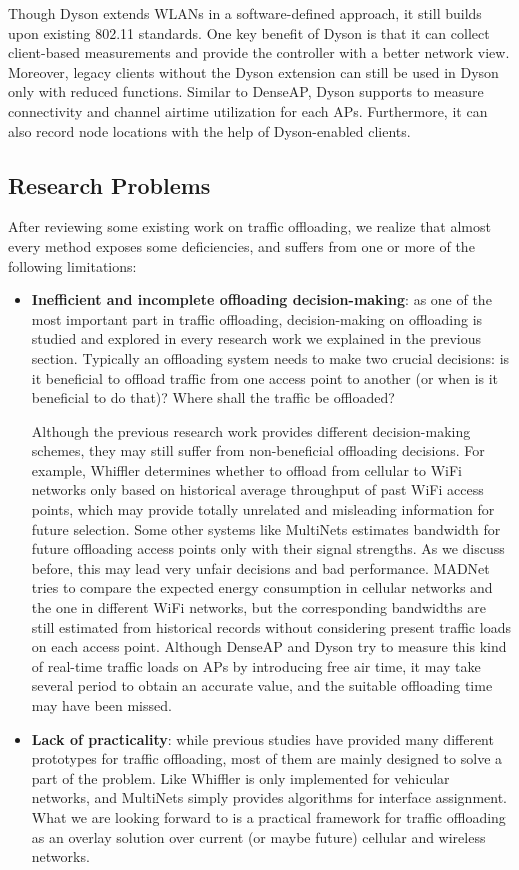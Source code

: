 \documentclass[english]{tktltiki}
\begin{document}
Though Dyson extends WLANs in a software-defined approach, it still builds upon existing 802.11 standards. One key benefit of Dyson is that it can collect client-based measurements and provide the controller with a better network view. Moreover, legacy clients without the Dyson extension can still be used in Dyson only with reduced functions. Similar to DenseAP, Dyson supports to measure connectivity and channel airtime utilization for each APs. Furthermore, it can also record node locations with the help of Dyson-enabled clients.


\subsection{Research Problems}

After reviewing some existing work on traffic offloading, we realize that almost every method exposes some deficiencies, and suffers from one or more of the following limitations:

\begin{itemize}
  \item \textbf{Inefficient and incomplete offloading decision-making}: as one of the most important part in traffic offloading, decision-making on offloading is studied and explored in every research work we explained in the previous section. Typically an offloading system needs to make two crucial decisions: is it beneficial to offload traffic from one access point to another (or when is it beneficial to do that)? Where shall the traffic be offloaded? 

Although the previous research work provides different decision-making schemes, they may still suffer from non-beneficial offloading decisions. For example, Whiffler determines whether to offload from cellular to WiFi networks only based on historical average throughput of past WiFi access points, which may provide totally unrelated and misleading information for future selection. Some other systems like MultiNets estimates bandwidth for future offloading access points only with their signal strengths. As we discuss before, this may lead very unfair decisions and bad performance. MADNet tries to compare the expected energy consumption in cellular networks and the one in different WiFi networks, but the corresponding bandwidths are still estimated from historical records without considering present traffic loads on each access point. Although DenseAP and Dyson try to measure this kind of real-time traffic loads on APs by introducing free air time, it may take several period to obtain an accurate value, and the suitable offloading time may have been missed.

  \item \textbf{Lack of practicality}: while previous studies have provided many different prototypes for traffic offloading, most of them are mainly designed to solve a part of the problem. Like Whiffler is only implemented for vehicular networks, and MultiNets simply provides algorithms for interface assignment. What we are looking forward to is a practical framework for traffic offloading as an overlay solution over current (or maybe future) cellular and wireless networks.

\end{itemize}
\end{document}
